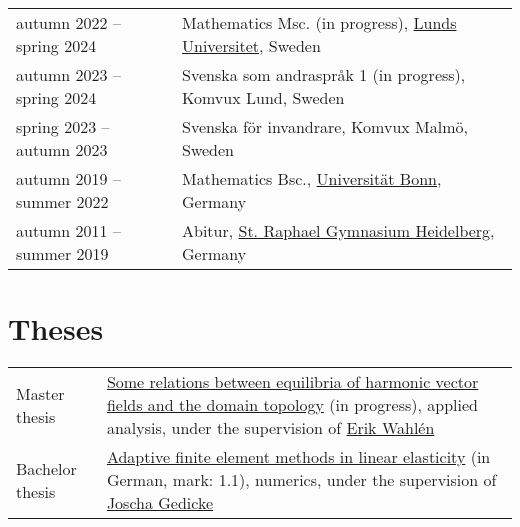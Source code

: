 \documentclass[11pt, letterpaper]{article}
\begin{document}
\begin{tabularx}{\textwidth}{>{\raggedright\arraybackslash}p{45mm} >{\raggedright\arraybackslash}X}
  autumn 2022\linebreak\hspace*{1em} -- spring 2024 & Mathematics Msc. (in progress), \href{https://maths.lu.se/}{Lunds Universitet}, Sweden \\[0.5ex]
  autumn 2023\linebreak\hspace*{1em} -- spring 2024 & Svenska som andraspråk 1 (in progress), Komvux Lund, Sweden \\[0.5ex]
  spring 2023\linebreak\hspace*{1em} -- autumn 2023 & Svenska för invandrare, Komvux Malmö, Sweden \\[0.5ex]
  autumn 2019\linebreak\hspace*{1em} -- summer 2022 & Mathematics Bsc., \href{http://www.math.uni-bonn.de/}{Universität Bonn}, Germany \\[0.5ex]
  autumn 2011\linebreak\hspace*{1em} -- summer 2019 & Abitur, \href{https://www.srgh.de/}{St. Raphael Gymnasium Heidelberg}, Germany
\end{tabularx}

\section{Theses}
\begin{tabularx}{\textwidth}{p{45mm} >{\raggedright\arraybackslash}X}
  Master thesis & \href{https://raw.githubusercontent.com/TheoKoppenhoefer/master-thesis/main/Text/Thesis_TheoKoppenhoefer.pdf}{Some relations between equilibria of harmonic vector fields and the domain topology} (in progress),
  applied analysis, under the supervision of \href{https://www.maths.lu.se/english/research/staff/erik-wahlen/}{Erik Wahlén} \\
  Bachelor thesis & \href{https://raw.githubusercontent.com/TheoKoppenhoefer/bachelorarbeit/main/Text/Bachelorarbeit_Hauptteil.pdf}{Adaptive finite element methods in linear elasticity} (in German,  \linebreak mark: 1.1),
  numerics, under the supervision of \href{https://ins.uni-bonn.de/staff/gedicke}{Joscha Gedicke}
\end{tabularx}
\end{document}
